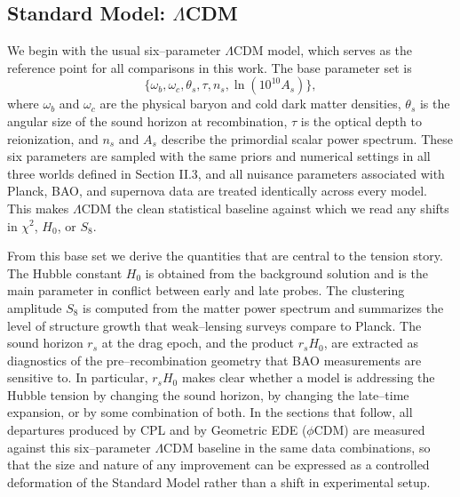 \documentclass[a4paper,11pt]{article}
\begin{document}

\subsection{Standard Model: $\Lambda$CDM}
\label{sec:lcdm}

We begin with the usual six--parameter $\Lambda$CDM model, which serves as the reference point for all comparisons in this work. The base parameter set is
\begin{equation}
\{\omega_b, \omega_c, \theta_s, \tau, n_s, \ln(10^{10} A_s)\},
\end{equation}
where $\omega_b$ and $\omega_c$ are the physical baryon and cold dark matter densities, $\theta_s$ is the angular size of the sound horizon at recombination, $\tau$ is the optical depth to reionization, and $n_s$ and $A_s$ describe the primordial scalar power spectrum. These six parameters are sampled with the same priors and numerical settings in all three worlds defined in Section II.3, and all nuisance parameters associated with Planck, BAO, and supernova data are treated identically across every model. This makes $\Lambda$CDM the clean statistical baseline against which we read any shifts in $\chi^2$, $H_0$, or $S_8$.

From this base set we derive the quantities that are central to the tension story. The Hubble constant $H_0$ is obtained from the background solution and is the main parameter in conflict between early and late probes. The clustering amplitude $S_8$ is computed from the matter power spectrum and summarizes the level of structure growth that weak--lensing surveys compare to Planck. The sound horizon $r_s$ at the drag epoch, and the product $r_s H_0$, are extracted as diagnostics of the pre--recombination geometry that BAO measurements are sensitive to. In particular, $r_s H_0$ makes clear whether a model is addressing the Hubble tension by changing the sound horizon, by changing the late--time expansion, or by some combination of both. In the sections that follow, all departures produced by CPL and by Geometric EDE ($\phi$CDM) are measured against this six--parameter $\Lambda$CDM baseline in the same data combinations, so that the size and nature of any improvement can be expressed as a controlled deformation of the Standard Model rather than a shift in experimental setup.
\end{document}
